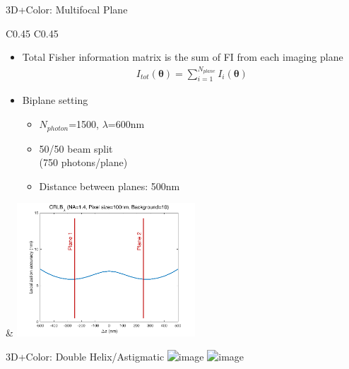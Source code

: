 \documentclass[t]{beamer}
\begin{document}
\begin{frame}{
    3D+Color: Multifocal Plane
    }
    \vspace{-1em}
    \begin{tabular}{C{0.45\textwidth} C{0.45\textwidth}}
    \begin{itemize}
        \item Total Fisher information matrix is the sum of FI from each imaging plane 
            \begin{gather*}
                I_{tot}(\boldsymbol{\theta}) = \sum_{i=1}^{N_{plane}}{I_{i}(\boldsymbol{\theta})}
            \end{gather*}
        \item Biplane setting
    \begin{itemize}
        \item    $N_{photon}$=1500, $\lambda$=600nm
        \item 50/50 beam split \\(750 photons/plane)
        \item Distance between planes: 500nm
    \end{itemize}
    \end{itemize}
    & 
            \centering
            \includegraphics[width=0.5\textwidth]{bp}
            \\
        \end{tabular}
\end{frame}

\begin{frame}{
        3D+Color: Double Helix/Astigmatic 
    }
    \includegraphics<1>[width=\textwidth]{dh1}
    \includegraphics<2>[width=\textwidth]{dh2}
\end{frame}
\end{document}
